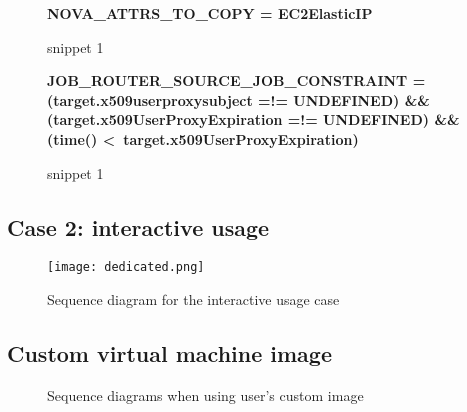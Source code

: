 \documentclass[a4paper]{jpconf}
\begin{document}
\begin{figure}[h!]
    \colorbox{htcondorbox}{
        \begin{minipage}{\textwidth}
        \small
            \bf{NOVA\_ATTRS\_TO\_COPY = EC2ElasticIP
            }
        \end{minipage}
    }
\caption{snippet 1}
\label{snippet1}
\end{figure}


\begin{figure}[h!]
    \colorbox{htcondorbox}{
        \begin{minipage}{\textwidth}
        \small
            \bf{JOB\_ROUTER\_SOURCE\_JOB\_CONSTRAINT = \newline
               (target.x509userproxysubject =!= UNDEFINED) \&\& \newline
               (target.x509UserProxyExpiration =!= UNDEFINED) \&\& \newline
               (time() \textless \  target.x509UserProxyExpiration)
            }
        \end{minipage}
    }
\caption{snippet 1}
\label{snippet1}
\end{figure}








\subsection{Case 2: interactive usage}


\begin{figure}[h]
    \centering
    \texttt{[image: dedicated.png]}
    \caption{Sequence diagram for the interactive usage case}
    \label{fig:interactive}
\end{figure}

\subsection{Custom virtual machine image}


\begin{figure}%
    \centering
    \qquad
    \caption{Sequence diagrams when using user's custom image}%
    \label{fig:custom}%
\end{figure}
\end{document}
